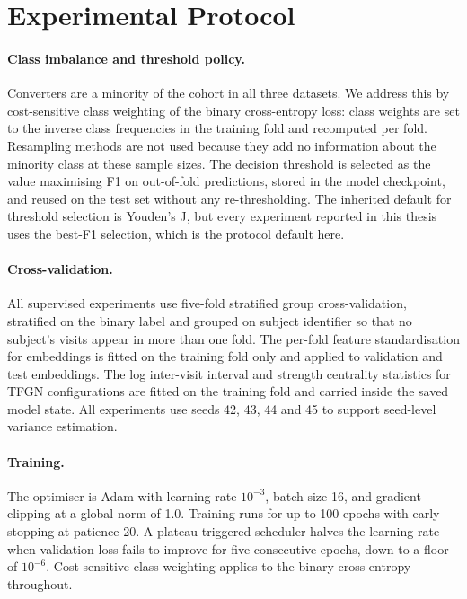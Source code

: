 \section{Experimental Protocol}\label{sec:protocol}

\paragraph{Class imbalance and threshold policy.}
Converters are a minority of the cohort in all three datasets. We address this by
cost-sensitive class weighting of the binary cross-entropy loss: class weights are set to
the inverse class frequencies in the training fold and recomputed per fold. Resampling
methods are not used because they add no information about the minority class at these
sample sizes. The decision threshold is selected as the value maximising F1 on out-of-fold
predictions, stored in the model checkpoint, and reused on the test set without any
re-thresholding. The inherited default for threshold selection is Youden's J, but every experiment
reported in this thesis uses the best-F1 selection, which is the protocol default here.

\paragraph{Cross-validation.}
All supervised experiments use five-fold stratified group cross-validation, stratified on
the binary label and grouped on subject identifier so that no subject's visits appear in
more than one fold. The per-fold feature standardisation for embeddings is fitted on the
training fold only and applied to validation and test embeddings. The log inter-visit
interval and strength centrality statistics for \ac{TFGN} configurations are fitted on the training
fold and carried inside the saved model state. All experiments use seeds 42, 43, 44 and 45
to support seed-level variance estimation.

\paragraph{Training.}
The optimiser is Adam with learning rate $10^{-3}$, batch size 16, and gradient clipping
at a global norm of 1.0. Training runs for up to 100 epochs with early stopping at patience
20. A plateau-triggered scheduler halves the learning rate when validation loss
fails to improve for five consecutive epochs, down to a floor of $10^{-6}$. Cost-sensitive
class weighting applies to the binary cross-entropy throughout.

